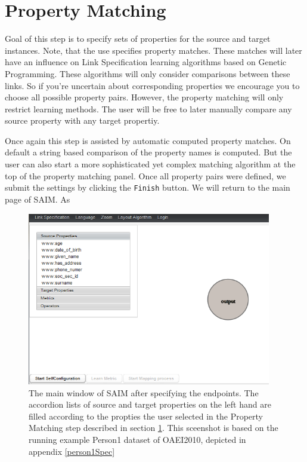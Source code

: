 \documentclass[oneside,a4paper,12pt]{memoir}
\begin{document}
	\section{Property Matching}
	\label{properties}
	Goal of this step is to specify sets of properties for the source and target instances. Note, that the use specifies property matches. These matches will later have an influence on Link Specification learning algorithms based on Genetic Programming. These algorithms will only consider comparisons between these links. So if you're uncertain about corresponding properties we encourage you to choose all possible property pairs. However, the property matching will only restrict learning methods. The user will be free to later manually compare any source property with any target propertiy.
	
	Once again this step is assisted by automatic computed property matches. On default a string based comparison of the property names is computed. But the user can also start a more sophisticated yet complex matching algorithm at the top of the property matching panel. Once all property pairs were defined, we submit the settings by clicking the \texttt{Finish} button. We will return to the main page of SAIM. As
	
 \begin{figure}[!ht]
		\centering
		\includegraphics[width=0.95\textwidth]{images/metric_empty.png}
		\caption{The main window of SAIM after specifying the endpoints. The accordion lists of source and target properties on the left hand are filled according to the propties the user selected in the Property Matching step described in section \ref{properties}. This sceenshot is based on the running example Person1 dataset of OAEI2010, depicted in appendix \ref{person1Spec}}
		\label{fig:metric_start}
	\end{figure}
	
\end{document}
